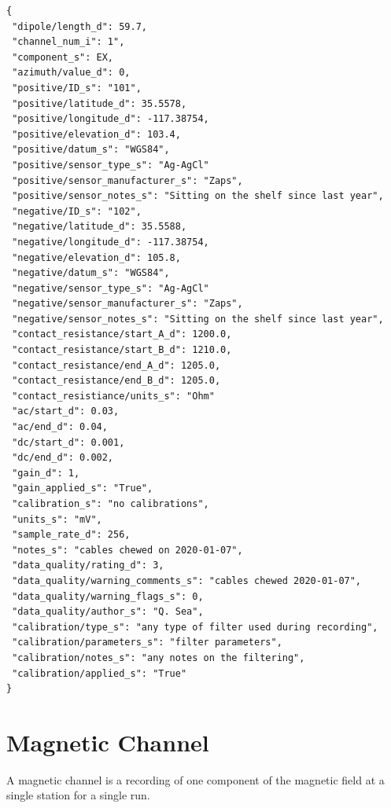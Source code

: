 \documentclass{article}
\begin{document}
\begin{verbatim}
{
 "dipole/length_d": 59.7,
 "channel_num_i": 1",
 "component_s": EX,
 "azimuth/value_d": 0,
 "positive/ID_s": "101",
 "positive/latitude_d": 35.5578,
 "positive/longitude_d": -117.38754,
 "positive/elevation_d": 103.4,
 "positive/datum_s": "WGS84",
 "positive/sensor_type_s": "Ag-AgCl"
 "positive/sensor_manufacturer_s": "Zaps",
 "positive/sensor_notes_s": "Sitting on the shelf since last year",
 "negative/ID_s": "102",
 "negative/latitude_d": 35.5588,
 "negative/longitude_d": -117.38754,
 "negative/elevation_d": 105.8,
 "negative/datum_s": "WGS84",
 "negative/sensor_type_s": "Ag-AgCl"
 "negative/sensor_manufacturer_s": "Zaps",
 "negative/sensor_notes_s": "Sitting on the shelf since last year",
 "contact_resistance/start_A_d": 1200.0,
 "contact_resistance/start_B_d": 1210.0,
 "contact_resistance/end_A_d": 1205.0,
 "contact_resistance/end_B_d": 1205.0,
 "contact_resistiance/units_s": "Ohm"
 "ac/start_d": 0.03,
 "ac/end_d": 0.04,
 "dc/start_d": 0.001,
 "dc/end_d": 0.002,
 "gain_d": 1,
 "gain_applied_s": "True",
 "calibration_s": "no calibrations",
 "units_s": "mV",
 "sample_rate_d": 256,
 "notes_s": "cables chewed on 2020-01-07",
 "data_quality/rating_d": 3,
 "data_quality/warning_comments_s": "cables chewed 2020-01-07",
 "data_quality/warning_flags_s": 0,
 "data_quality/author_s": "Q. Sea",
 "calibration/type_s": "any type of filter used during recording",
 "calibration/parameters_s": "filter parameters",
 "calibration/notes_s": "any notes on the filtering",
 "calibration/applied_s": "True"
}
\end{verbatim}

\newpage
\section{Magnetic Channel}

A magnetic channel is a recording of one component of the magnetic field at a single station for a single run.
\end{document}
